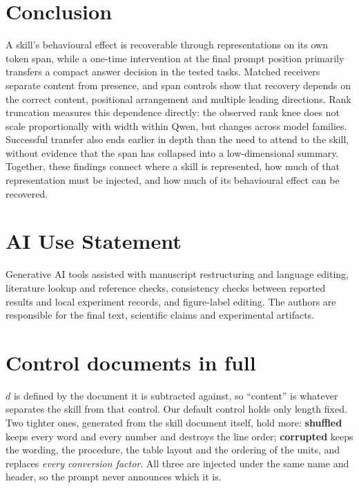 \documentclass{article}
\newcommand{\dvec}{\ensuremath{d}}
\begin{document}
\section{Conclusion}

A skill's behavioural effect is recoverable through representations on its own
token span, while a one-time intervention at the final prompt position primarily
transfers a compact answer decision in the tested tasks. Matched receivers
separate content from presence, and span controls show that recovery depends on
the correct content, positional arrangement and multiple leading directions.
Rank truncation measures this dependence directly: the observed rank knee does
not scale proportionally with width within Qwen, but changes across model
families. Successful transfer also ends earlier in depth than the need to attend
to the skill, without evidence that the span has collapsed into a low-dimensional
summary. Together, these findings connect where a skill is represented, how much
of that representation must be injected, and how much of its behavioural effect
can be recovered.

\label{endmain}
\clearpage
\section*{AI Use Statement}
Generative AI tools assisted with manuscript restructuring and language editing,
literature lookup and reference checks, consistency checks between reported
results and local experiment records, and figure-label editing. The authors
are responsible for the final text, scientific claims and experimental artifacts.




\clearpage
\appendix

\section{Control documents in full}
\label{app:controls}

$\dvec$ is defined by the document it is subtracted against, so ``content'' is
whatever separates the skill from that control. Our default control holds only
length fixed. Two tighter ones, generated from the skill document itself, hold
more: \textbf{shuffled} keeps every word and every number and destroys the line
order; \textbf{corrupted} keeps the wording, the procedure, the table layout and
the ordering of the units, and replaces \emph{every conversion factor}. All
three are injected under the same name and header, so the prompt never announces
which it is.
\end{document}

